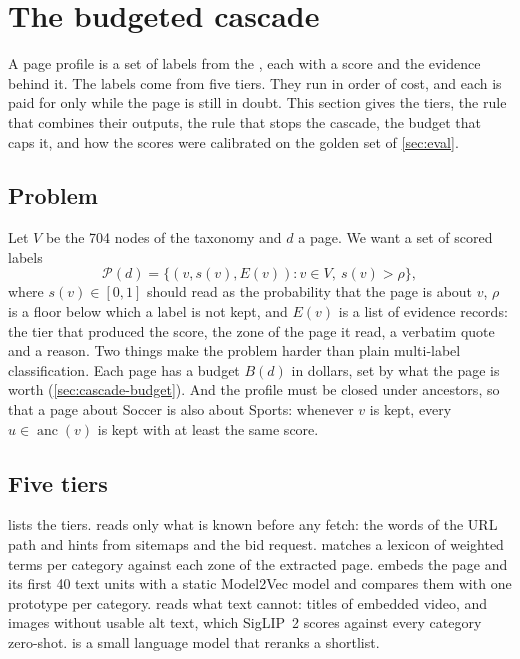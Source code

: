 \section{The budgeted cascade}\label{sec:cascade}

A page profile is a set of labels from the \iab, each with a score and the evidence behind it. The labels come from five tiers. They run in order of cost, and each is paid for only while the page is still in doubt. This section gives the tiers, the rule that combines their outputs, the rule that stops the cascade, the budget that caps it, and how the scores were calibrated on the golden set of \cref{sec:eval}.

\subsection{Problem}\label{sec:cascade-problem}

Let $V$ be the 704 nodes of the taxonomy and $d$ a page. We want a set of scored labels
\begin{equation}\label{eq:cascade-profile}
  \mathcal{P}(d) = \{(v, s(v), E(v)) : v \in V,\ s(v) > \rho\},
\end{equation}
where $s(v) \in [0,1]$ should read as the probability that the page is about $v$, $\rho$ is a floor below which a label is not kept, and $E(v)$ is a list of evidence records: the tier that produced the score, the zone of the page it read, a verbatim quote and a reason. Two things make the problem harder than plain multi-label classification. Each page has a budget $B(d)$ in dollars, set by what the page is worth (\cref{sec:cascade-budget}). And the profile must be closed under ancestors, so that a page about Soccer is also about Sports: whenever $v$ is kept, every $u \in \operatorname{anc}(v)$ is kept with at least the same score.

\subsection{Five tiers}\label{sec:cascade-tiers}

 lists the tiers.  reads only what is known before any fetch: the words of the URL path and hints from sitemaps and the bid request.  matches a lexicon of weighted terms per category against each zone of the extracted page.  embeds the page and its first 40 text units with a static Model2Vec model \citep{tulkens2024model2vec} and compares them with one prototype per category.  reads what text cannot: titles of embedded video, and images without usable alt text, which SigLIP~2 \citep{tschannen2025siglip} scores against every category zero-shot.  is a small language model that reranks a shortlist.

